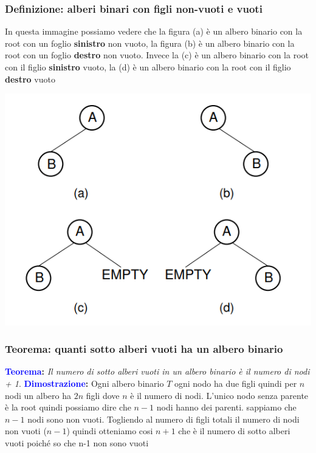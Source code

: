 \subsubsection{Definizione: alberi binari con figli non-vuoti e vuoti}
In questa immagine possiamo vedere che la figura (a) è un albero binario con la root con un foglio \textbf{sinistro} non vuoto, la figura (b)  è un albero binario con la root con un foglio \textbf{destro} non vuoto. Invece la (c)  è un albero binario con la root con il figlio \textbf{sinistro} vuoto, la (d)  è un albero binario con la root con il figlio \textbf{destro} vuoto
\begin{center}
    \includegraphics[scale = 0.5]{Capitoli/Alberi Binari/Esempi/Alberinonvuoti.png}
\end{center}
\subsubsection{Teorema: quanti sotto alberi vuoti ha un albero binario}
\textbf{\textcolor{blue}{Teorema}:} \textit{Il numero di  sotto alberi vuoti in un albero binario è il numero di nodi + 1}. \newline\newline
\textbf{\textcolor{blue}{Dimostrazione}:} Ogni albero binario $T$ ogni nodo ha due figli quindi per $n$ nodi un albero ha $2n$ figli dove $n$ è il numero di nodi. L'unico nodo senza parente è la root quindi possiamo dire che $n-1$ nodi hanno dei parenti.
sappiamo che $n-1$ nodi sono non vuoti. Togliendo al numero di figli totali il numero di nodi non vuoti ($n-1$) quindi otteniamo cosi $n+1$ che è il numero di sotto alberi vuoti poiché so che n-1 non sono vuoti

